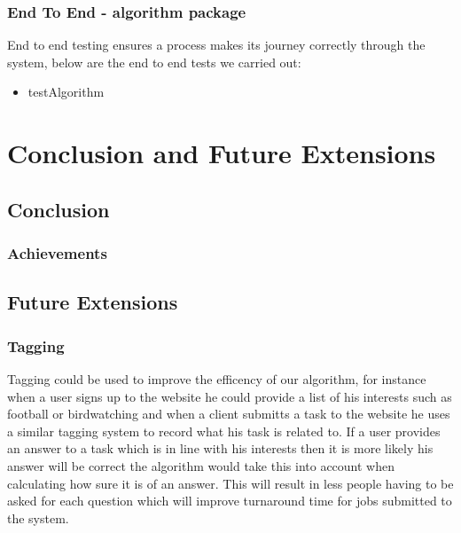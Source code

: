 \documentclass[11pt]{article}
\begin{document}
\subsubsection{End To End - algorithm package}
End to end testing ensures a process makes its journey correctly through the system, below are the end to end tests we carried out:
\begin{itemize}
\item testAlgorithm
\end{itemize}


\section{Conclusion and Future Extensions}

\subsection{Conclusion}
\subsubsection{Achievements}
\subsection{Future Extensions}

\subsubsection{Tagging}
Tagging could be used to improve the efficency of our algorithm, for instance when a user signs up to the website he could provide a list of his
interests such as football or birdwatching and when a client submitts a task to the website he uses a similar tagging system to record what his
task is related to. If a user provides an answer to a task which is in line with his interests then it is more likely his answer will be correct
the algorithm would take this into account when calculating how sure it is of an answer. This will result in less people having to be asked 
for each question which will improve turnaround time for jobs submitted to the system. 
\end{document}
